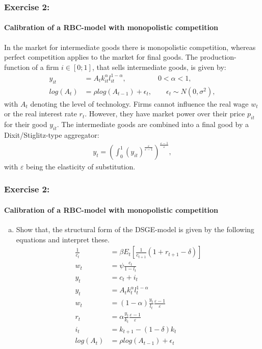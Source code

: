 \documentclass{beamer} %
\newcounter{saveenumi}
\newcommand{\seti}{\setcounter{saveenumi}{\value{enumi}}}
\begin{document}
\begin{frame}\frametitle{Exercise 2:}\framesubtitle{Calibration of a RBC-model with monopolistic competition}
In the market for intermediate goods there is monopolistic competition,
whereas perfect competition applies to the market for final goods. The
production-function of a firm $i\in[0;1]$, that sells intermediate goods, is
given by:
\begin{align*}
  y_{it}&=A_t k_{it}^\alpha l_{it}^{1-\alpha}, \qquad \qquad ~~0<\alpha<1,\\
  log(A_t) &= \rho log(A_{t-1}) + \epsilon_t, \qquad \epsilon_t \sim N(0,\sigma^2),
\end{align*}
with $A_t$ denoting the level of technology. Firms cannot influence the real
wage $w_t$ or the real interest rate $r_t$. However, they have market power
over their price $p_{it}$ for their good $y_{it}$. The intermediate goods are
combined into a final good by a Dixit/Stiglitz-type aggregator:
\begin{align*}
  y_t = \left(\int_0^1 (y_{it})^{\frac{\varepsilon}{\varepsilon-1}}\right)^{\frac{\varepsilon-1}{\varepsilon}},
\end{align*}
with $\varepsilon$ being the elasticity of substitution.
\end{frame}

\begin{frame}\frametitle{Exercise 2:}\framesubtitle{Calibration of a RBC-model with monopolistic competition}
\begin{enumerate}[(a)]
   \item Show that, the structural form of the DSGE-model is given by the
       following equations and interpret these.
       \begin{align}
         \frac{1}{c_t} &= \beta E_t \left[\frac{1}{c_{t+1}} (1+r_{t+1}-\delta)\right]\\
         w_t &= \psi \frac{c_t}{1-l_t}\\
         y_t &= c_t + i_t\\
         y_t &= A_t k_{t}^\alpha l_t^{1-\alpha}\\
         w_t & = (1-\alpha) \frac{y_t}{l_t} \frac{\varepsilon -1}{\varepsilon}\\
         r_t & = \alpha \frac{y_t}{k_t} \frac{\varepsilon -1}{\varepsilon}\\
         i_t &= k_{t+1} - (1-\delta) k_t\\
         log(A_t) &= \rho log(A_{t-1}) + \epsilon_t
       \end{align}\seti
\end{enumerate}

\end{frame}
\end{document}
